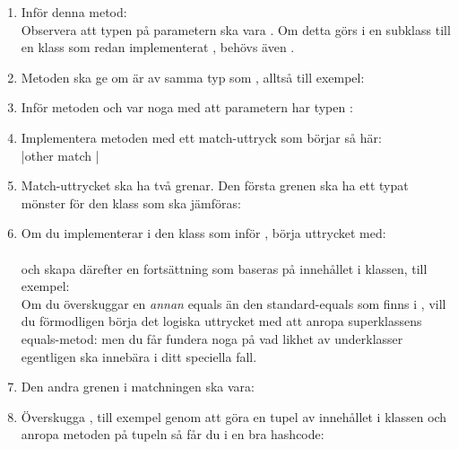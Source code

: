 \begin{enumerate}[leftmargin=*]
\item Inför denna metod: \\Observera att typen på parametern ska vara . Om detta görs i en subklass till en klass som redan implementerat , behövs även .

\item Metoden  ska ge  om  är av samma typ som , alltså till exempel: \\

\item Inför metoden  och var noga med att parametern har typen : \\ 

\item Implementera metoden  med ett match-uttryck som börjar så här: \\
\code|other match |

\item Match-uttrycket ska ha två grenar. Den första grenen ska ha ett typat mönster för den klass som ska jämföras: \\ 

\item Om du implementerar  i den klass som inför , börja uttrycket med: \\  \\
och skapa därefter en fortsättning som baseras på innehållet i klassen, till exempel:  \\
Om du överskuggar en \textit{annan} equals än den standard-equals som finns i , vill du förmodligen börja det logiska uttrycket med att anropa superklassens equals-metod:
  men du får fundera noga på vad likhet av underklasser egentligen ska innebära i ditt speciella fall.

\item Den andra grenen i matchningen ska vara:

\item Överskugga , till exempel genom att göra en tupel av innehållet i klassen och anropa metoden \code{##} på tupeln så får du i en bra hashcode: \\

\end{enumerate}


